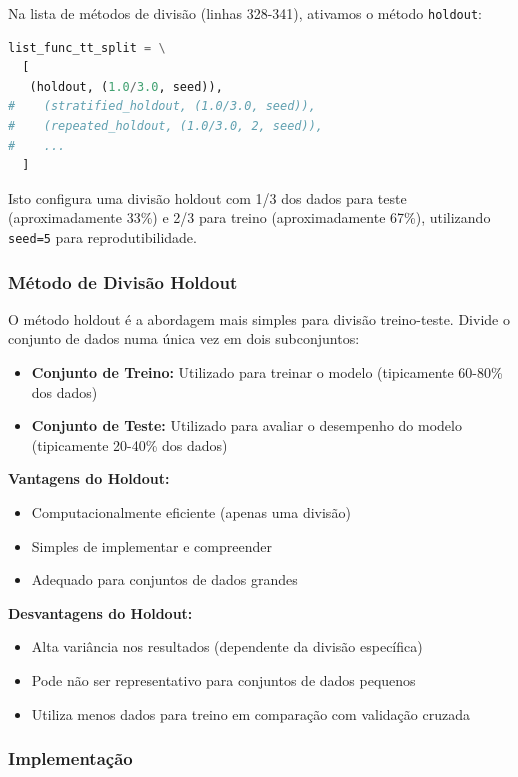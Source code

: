 \documentclass[12pt,a4paper]{article}
\begin{document}
Na lista de métodos de divisão (linhas 328-341), ativamos o método \texttt{holdout}:
\begin{lstlisting}[language=Python]
list_func_tt_split = \
  [
   (holdout, (1.0/3.0, seed)),
#    (stratified_holdout, (1.0/3.0, seed)),
#    (repeated_holdout, (1.0/3.0, 2, seed)),
#    ...
  ]
\end{lstlisting}

Isto configura uma divisão holdout com 1/3 dos dados para teste (aproximadamente 33\%) e 2/3 para treino (aproximadamente 67\%), utilizando \texttt{seed=5} para reprodutibilidade.

\subsubsection{Método de Divisão Holdout}

O método holdout é a abordagem mais simples para divisão treino-teste. Divide o conjunto de dados numa única vez em dois subconjuntos:

\begin{itemize}
    \item \textbf{Conjunto de Treino:} Utilizado para treinar o modelo (tipicamente 60-80\% dos dados)
    \item \textbf{Conjunto de Teste:} Utilizado para avaliar o desempenho do modelo (tipicamente 20-40\% dos dados)
\end{itemize}

\textbf{Vantagens do Holdout:}
\begin{itemize}
    \item Computacionalmente eficiente (apenas uma divisão)
    \item Simples de implementar e compreender
    \item Adequado para conjuntos de dados grandes
\end{itemize}

\textbf{Desvantagens do Holdout:}
\begin{itemize}
    \item Alta variância nos resultados (dependente da divisão específica)
    \item Pode não ser representativo para conjuntos de dados pequenos
    \item Utiliza menos dados para treino em comparação com validação cruzada
\end{itemize}

\subsubsection{Implementação}
\end{document}
